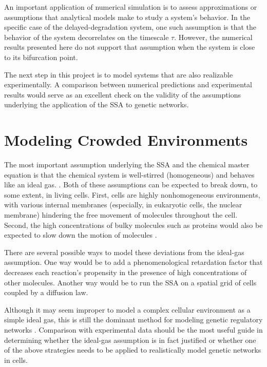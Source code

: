 \documentclass[english,letterpaper,12pt]{report}
\begin{document}
\begin{doublespacing}
An important application of numerical simulation is to assess approximations or assumptions that analytical models make to study a system's behavior. In the specific case of the delayed-degradation system, one such assumption is that the behavior of the system decorrelates on the timescale $\tau$. However, the numerical results presented here do not support that assumption when the system is close to its bifurcation point.

The next step in this project is to model systems that are also realizable experimentally. A comparison between numerical predictions and experimental results would serve as an excellent check on the validity of the assumptions underlying the application of the SSA to genetic networks.

\section{Modeling Crowded Environments} %
\label{sub:diffusion-crowded}

The most important assumption underlying the SSA and the chemical master equation is that the chemical system is well-stirred (homogeneous) and behaves like an ideal gas. . Both of these assumptions can be expected to break down, to some extent, in living cells. First, cells are highly nonhomogeneous environments, with various internal membranes (especially, in eukaryotic cells, the nuclear membrane) hindering the free movement of molecules throughout the cell. Second, the high concentrations of bulky molecules such as proteins would also be expected to slow down the motion of molecules .

There are several possible ways to model these deviations from the ideal-gas assumption. One way would be to add a phenomenological retardation factor that decreases each reaction's propensity in the presence of high concentrations of other molecules. Another way would be to run the SSA on a spatial grid of cells coupled by a diffusion law.

Although it may seem improper to model a complex cellular environment as a simple ideal gas, this is still the dominant method for modeling genetic regulatory networks . Comparison with experimental data should be the most useful guide in determining whether the ideal-gas assumption is in fact justified or whether one of the above strategies needs to be applied to realistically model genetic networks in cells.


\end{doublespacing}
\end{document}

